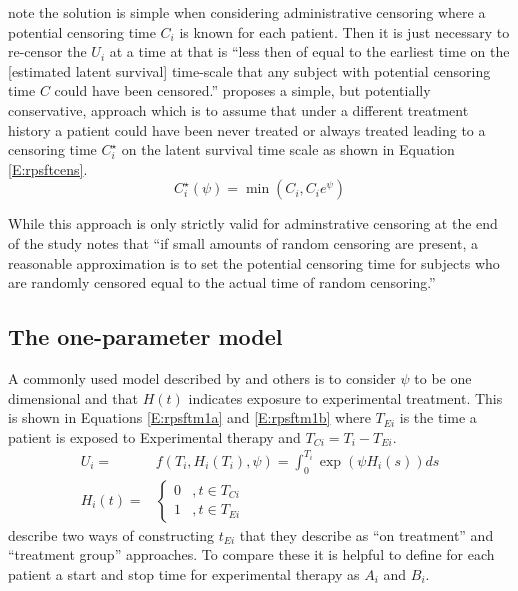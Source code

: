 \cite{Robins1991} note the solution is simple when considering administrative censoring where a potential censoring time $C_i$ is known for each patient. Then it is just necessary to re-censor the $U_i$ at a time at that is ``less then of equal to the earliest time on the [estimated latent survival] time-scale that any subject with potential censoring time $C$ could have been censored.'' \cite{White1999} proposes a simple, but potentially conservative, approach which is to assume that under a different treatment history a patient could have been never treated or always treated leading to a censoring time $C_i^\star$ on the latent survival time scale as shown in Equation \ref{E:rpsftcens}.
\begin{equation}
\label{E:rpsftcens}
C_i^\star(\psi) = \min \left( C_i, C_i e^\psi \right)
\end{equation}


While this approach is only strictly valid for adminstrative censoring at the end of the study \cite{White2002} notes that ``if small amounts of random censoring are present, a reasonable approximation is to set the potential censoring time for subjects who are randomly censored equal to the actual time of random censoring.''





\subsection{The one-parameter model}
\label{S:chap_methrev:RPSFTonep}
A commonly used model described by \cite{Watkins2013} and others is to consider $\psi$ to be one dimensional and that $H(t)$ indicates exposure to experimental treatment. This is shown in Equations \ref{E:rpsftm1a} and \ref{E:rpsftm1b} where $T_{Ei}$ is the time a patient is exposed to Experimental therapy and $T_{Ci} = T_i - T_{Ei}$.
\begin{align}
U_i =& f\left(T_i, H_i(T_i), \psi\right) = \int_0^{T_i} \exp\left(\psi H_i(s) \right) ds \label{E:rpsftm1a}\\
H_i(t)=& \begin{cases} 
	0 &,t \in T_{Ci} \\ 
    1 &,t \in T_{Ei} 
    \end{cases}  \label{E:rpsftm1b}
\end{align}
\cite{TSD16} describe two ways of constructing $t_{Ei}$ that they describe as ``on treatment'' and ``treatment group'' approaches. To compare these it is helpful to define for each patient a start and stop time for experimental therapy as $A_{i}$ and $B_{i}$. 

